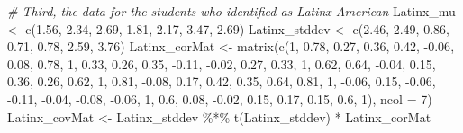 \documentclass[
  11pt,
]{book}
\newenvironment{Shaded}{\begin{snugshade}}{\end{snugshade}}
\newcommand{\AttributeTok}[1]{\textcolor[rgb]{0.77,0.63,0.00}{#1}}
\newcommand{\CommentTok}[1]{\textcolor[rgb]{0.56,0.35,0.01}{\textit{#1}}}
\newcommand{\DecValTok}[1]{\textcolor[rgb]{0.00,0.00,0.81}{#1}}
\newcommand{\FloatTok}[1]{\textcolor[rgb]{0.00,0.00,0.81}{#1}}
\newcommand{\FunctionTok}[1]{\textcolor[rgb]{0.00,0.00,0.00}{#1}}
\newcommand{\NormalTok}[1]{#1}
\newcommand{\OtherTok}[1]{\textcolor[rgb]{0.56,0.35,0.01}{#1}}
\newcommand{\SpecialCharTok}[1]{\textcolor[rgb]{0.00,0.00,0.00}{#1}}
\begin{document}
\begin{Shaded}
\begin{Highlighting}[]
\CommentTok{\# Third, the data for the students who identified as Latinx American}
\NormalTok{Latinx\_mu }\OtherTok{\textless{}{-}} \FunctionTok{c}\NormalTok{(}\FloatTok{1.56}\NormalTok{, }\FloatTok{2.34}\NormalTok{, }\FloatTok{2.69}\NormalTok{, }\FloatTok{1.81}\NormalTok{, }\FloatTok{2.17}\NormalTok{, }\FloatTok{3.47}\NormalTok{, }\FloatTok{2.69}\NormalTok{)}
\NormalTok{Latinx\_stddev }\OtherTok{\textless{}{-}} \FunctionTok{c}\NormalTok{(}\FloatTok{2.46}\NormalTok{, }\FloatTok{2.49}\NormalTok{, }\FloatTok{0.86}\NormalTok{, }\FloatTok{0.71}\NormalTok{, }\FloatTok{0.78}\NormalTok{, }\FloatTok{2.59}\NormalTok{, }\FloatTok{3.76}\NormalTok{)}
\NormalTok{Latinx\_corMat }\OtherTok{\textless{}{-}} \FunctionTok{matrix}\NormalTok{(}\FunctionTok{c}\NormalTok{(}\DecValTok{1}\NormalTok{, }\FloatTok{0.78}\NormalTok{, }\FloatTok{0.27}\NormalTok{, }\FloatTok{0.36}\NormalTok{, }\FloatTok{0.42}\NormalTok{, }\SpecialCharTok{{-}}\FloatTok{0.06}\NormalTok{, }\FloatTok{0.08}\NormalTok{, }\FloatTok{0.78}\NormalTok{,}
    \DecValTok{1}\NormalTok{, }\FloatTok{0.33}\NormalTok{, }\FloatTok{0.26}\NormalTok{, }\FloatTok{0.35}\NormalTok{, }\SpecialCharTok{{-}}\FloatTok{0.11}\NormalTok{, }\SpecialCharTok{{-}}\FloatTok{0.02}\NormalTok{, }\FloatTok{0.27}\NormalTok{, }\FloatTok{0.33}\NormalTok{, }\DecValTok{1}\NormalTok{, }\FloatTok{0.62}\NormalTok{, }\FloatTok{0.64}\NormalTok{, }\SpecialCharTok{{-}}\FloatTok{0.04}\NormalTok{,}
    \FloatTok{0.15}\NormalTok{, }\FloatTok{0.36}\NormalTok{, }\FloatTok{0.26}\NormalTok{, }\FloatTok{0.62}\NormalTok{, }\DecValTok{1}\NormalTok{, }\FloatTok{0.81}\NormalTok{, }\SpecialCharTok{{-}}\FloatTok{0.08}\NormalTok{, }\FloatTok{0.17}\NormalTok{, }\FloatTok{0.42}\NormalTok{, }\FloatTok{0.35}\NormalTok{, }\FloatTok{0.64}\NormalTok{, }\FloatTok{0.81}\NormalTok{,}
    \DecValTok{1}\NormalTok{, }\SpecialCharTok{{-}}\FloatTok{0.06}\NormalTok{, }\FloatTok{0.15}\NormalTok{, }\SpecialCharTok{{-}}\FloatTok{0.06}\NormalTok{, }\SpecialCharTok{{-}}\FloatTok{0.11}\NormalTok{, }\SpecialCharTok{{-}}\FloatTok{0.04}\NormalTok{, }\SpecialCharTok{{-}}\FloatTok{0.08}\NormalTok{, }\SpecialCharTok{{-}}\FloatTok{0.06}\NormalTok{, }\DecValTok{1}\NormalTok{, }\FloatTok{0.6}\NormalTok{, }\FloatTok{0.08}\NormalTok{, }\SpecialCharTok{{-}}\FloatTok{0.02}\NormalTok{,}
    \FloatTok{0.15}\NormalTok{, }\FloatTok{0.17}\NormalTok{, }\FloatTok{0.15}\NormalTok{, }\FloatTok{0.6}\NormalTok{, }\DecValTok{1}\NormalTok{), }\AttributeTok{ncol =} \DecValTok{7}\NormalTok{)}
\NormalTok{Latinx\_covMat }\OtherTok{\textless{}{-}}\NormalTok{ Latinx\_stddev }\SpecialCharTok{\%*\%} \FunctionTok{t}\NormalTok{(Latinx\_stddev) }\SpecialCharTok{*}\NormalTok{ Latinx\_corMat}

\end{Highlighting}
\end{Shaded}
\end{document}
